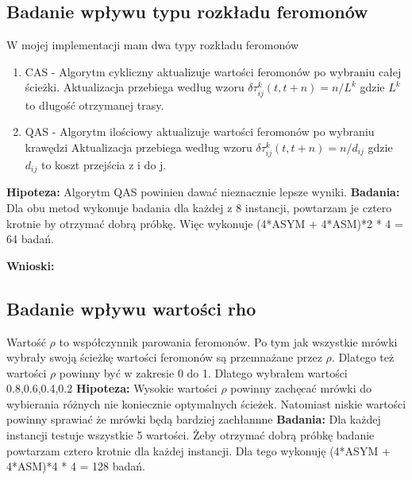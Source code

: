 \documentclass{article}
\begin{document}
      \subsection{Badanie wpływu typu rozkładu feromonów}
        W mojej implementacji mam dwa typy rozkładu feromonów
        \begin{enumerate}
          \item CAS - Algorytm cykliczny aktualizuje wartości feromonów po 
          wybraniu całej ścieżki. Aktualizacja przebiega według wzoru 
          $\delta \tau_{ij}^k(t,t+n) = n/L^k$ gdzie $L^k$ to długość otrzymanej trasy.
          \item QAS - Algorytm ilościowy aktualizuje wartości feromonów po 
          wybraniu krawędzi Aktualizacja przebiega według wzoru 
          $\delta \tau_{ij}^k(t,t+n) = n/d_{ij}$ gdzie $d_{ij}$ to koszt przejścia
          z i do j.\linebreak
        \end{enumerate}
        \textbf{Hipoteza: } Algorytm QAS powinien dawać nieznacznie lepsze wyniki.\linebreak
        \textbf{Badania: } Dla obu metod wykonuje badania dla każdej z 8 
        instancji, powtarzam je cztero krotnie by otrzymać dobrą próbkę.
        Więc wykonuje (4*ASYM + 4*ASM)*2 * 4 = 64 badań.\linebreak

        \textbf{Wnioski: } 
      \subsection{Badanie wpływu wartości rho}
        Wartość $\rho$ to współczynnik parowania feromonów. Po tym jak wszystkie
        mrówki wybrały swoją ścieżkę wartości feromonów są przemnażane przez $\rho$.
        Dlatego też wartości $\rho$ powinny być w zakresie 0 do 1. Dlatego wybrałem
        wartości 0.8,0.6,0.4,0.2\linebreak
        \textbf{Hipoteza: } Wysokie wartości $\rho$ powinny zachęcać mrówki do wybierania
        różnych nie koniecznie optymalnych ścieżek. Natomiast niskie wartości powinny 
        sprawiać że mrówki będą bardziej zachłannne\linebreak
        \textbf{Badania: } Dla każdej instancji testuje wszystkie 5 wartości. 
        Żeby otrzymać dobrą próbkę badanie powtarzam cztero krotnie dla każdej 
        instancji. Dla tego wykonuję (4*ASYM + 4*ASM)*4 * 4 = 128 badań.\linebreak
\end{document}
